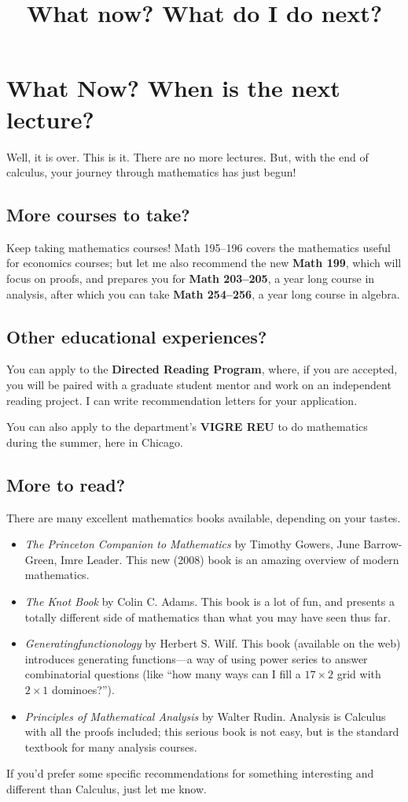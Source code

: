 \documentclass[12pt]{article}
\title{What now?  What do I do next?}
\begin{document}
\section*{What Now?  When is the next lecture?}

Well, it is over.  This is it.  There are no more lectures.  But, with
the end of calculus, your journey through mathematics has just
begun!

\subsection*{More courses to take?}

Keep taking mathematics courses!  Math 195--196 covers the mathematics
useful for economics courses; but let me also recommend the new
\textbf{Math 199}, which will focus on proofs, and prepares you for
\textbf{Math 203--205}, a year long course in analysis, after which
you can take \textbf{Math 254--256}, a year long course in algebra.

\subsection*{Other educational experiences?}

You can apply to the \textbf{Directed Reading Program}, where, if you
are accepted, you will be paired with a graduate student mentor and
work on an independent reading project.  I can write recommendation
letters for your application.

You can also apply to the department's \textbf{VIGRE REU} to do
mathematics during the summer, here in Chicago.

\subsection*{More to read?}

There are many excellent mathematics books available, depending on
your tastes.
\begin{itemize}
\item \textit{The Princeton Companion to Mathematics} by Timothy
  Gowers, June Barrow-Green, Imre Leader.  This new (2008) book is an
  amazing overview of modern mathematics.

\item \textit{The Knot Book} by Colin C. Adams.  This book is a
  lot of fun, and presents a totally different side of mathematics
  than what you may have seen thus far.

\item \textit{Generatingfunctionology} by Herbert S. Wilf.  This book
  (available on the web) introduces generating functions---a way of
  using power series to answer combinatorial questions (like ``how
  many ways can I fill a $17 \times 2$ grid with $2 \times 1$
  dominoes?'').

\item \textit{Principles of Mathematical Analysis} by Walter Rudin.
  Analysis is Calculus with all the proofs included; this serious book
  is not easy, but is the standard textbook for many analysis courses.
\end{itemize}
If you'd prefer some specific recommendations for something
interesting and different than Calculus, just let me know.
\end{document}
